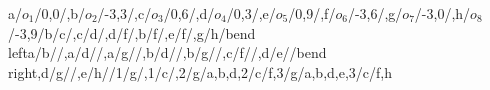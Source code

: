 \begin{compatibilitygraph}{a/$o_1$/{0,0}/,b/$o_2$/{-3,3}/,c/$o_3$/{0,6}/,d/$o_4$/{0,3}/,e/$o_5$/{0,9}/,f/$o_6$/{-3,6}/,g/$o_7$/{-3,0}/,h/$o_8$/{-3,9}/}{b/c/,c/d/,d/f/,b/f/,e/f/,g/h/bend left}{a/b//,a/d//,a/g//,b/d//,b/g//,c/f//,d/e//bend right,d/g//,e/h//}{}{}{1/g/,1/c/,2/g/{a,b,d},2/c/{f},3/g/{a,b,d,e},3/c/{f,h}}
\end{compatibilitygraph}